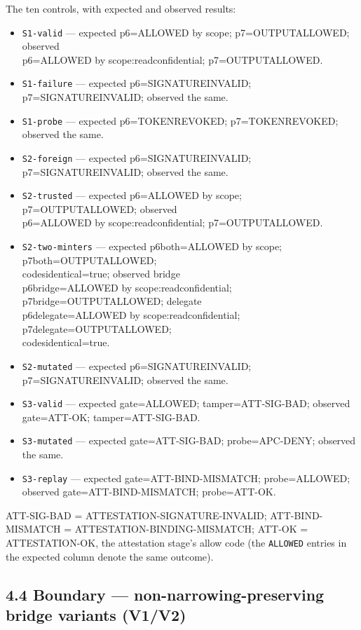 \documentclass[
  10pt,
]{article}
\providecommand{\tightlist}{%
  \setlength{\itemsep}{0pt}\setlength{\parskip}{0pt}}
\renewcommand{\_}{\origunderscore\allowbreak}
\begin{document}
The ten controls, with expected and observed results:

\begin{itemize}
\tightlist
\item
  \texttt{S1-valid} --- expected p6=ALLOWED by scope;
  p7=OUTPUT\_ALLOWED; observed\\
  p6=ALLOWED by scope:read\_confidential; p7=OUTPUT\_ALLOWED.
\item
  \texttt{S1-failure} --- expected p6=SIGNATURE\_INVALID;
  p7=SIGNATURE\_INVALID; observed the same.
\item
  \texttt{S1-probe} --- expected p6=TOKEN\_REVOKED; p7=TOKEN\_REVOKED;
  observed the same.
\item
  \texttt{S2-foreign} --- expected p6=SIGNATURE\_INVALID;
  p7=SIGNATURE\_INVALID; observed the same.
\item
  \texttt{S2-trusted} --- expected p6=ALLOWED by scope;
  p7=OUTPUT\_ALLOWED; observed\\
  p6=ALLOWED by scope:read\_confidential; p7=OUTPUT\_ALLOWED.
\item
  \texttt{S2-two-minters} --- expected p6\_both=ALLOWED by scope;
  p7\_both=OUTPUT\_ALLOWED;\\
  codes\_identical=true; observed bridge\\
  p6\_bridge=ALLOWED by scope:read\_confidential;
  p7\_bridge=OUTPUT\_ALLOWED; delegate\\
  p6\_delegate=ALLOWED by scope:read\_confidential;
  p7\_delegate=OUTPUT\_ALLOWED;\\
  codes\_identical=true.
\item
  \texttt{S2-mutated} --- expected p6=SIGNATURE\_INVALID;
  p7=SIGNATURE\_INVALID; observed the same.
\item
  \texttt{S3-valid} --- expected gate=ALLOWED; tamper=ATT-SIG-BAD;
  observed gate=ATT-OK; tamper=ATT-SIG-BAD.
\item
  \texttt{S3-mutated} --- expected gate=ATT-SIG-BAD; probe=APC-DENY;
  observed the same.
\item
  \texttt{S3-replay} --- expected gate=ATT-BIND-MISMATCH; probe=ALLOWED;
  observed gate=ATT-BIND-MISMATCH; probe=ATT-OK.
\end{itemize}

ATT-SIG-BAD = ATTESTATION-SIGNATURE-INVALID; ATT-BIND-MISMATCH =
ATTESTATION-BINDING-MISMATCH; ATT-OK = ATTESTATION-OK, the attestation
stage's allow code (the \texttt{ALLOWED} entries in the expected column
denote the same outcome).

\subsection{4.4 Boundary --- non-narrowing-preserving bridge variants
(V1/V2)}\label{boundary-non-narrowing-preserving-bridge-variants-v1v2}
\end{document}
